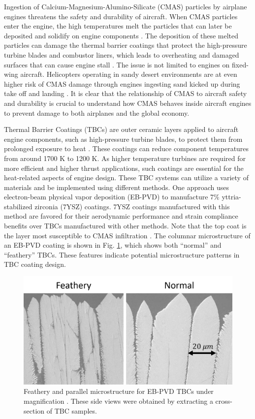\documentclass[%
 aip,
 amsmath,amssymb,
 reprint,%
floatfix]{revtex4-1}
\begin{document}
Ingestion of Calcium-Magnesium-Alumino-Silicate (CMAS) particles by airplane engines threatens the safety and durability of aircraft. 
When CMAS particles enter the engine, the high temperatures melt the particles that can later be deposited and solidify on engine components \cite{Chen2015}. The deposition of these melted particles can damage the thermal barrier coatings that protect the high-pressure turbine blades and combustor liners, which leads to overheating and damaged surfaces that can cause engine stall \cite{Chen2015}. The issue is not limited to engines on fixed-wing aircraft. Helicopters operating in sandy desert environments are at even higher risk of CMAS damage through engines ingesting sand kicked up during take off and landing \cite{Smialek}. 
It is clear that the relationship of CMAS to aircraft safety and durability is crucial to understand how CMAS behaves inside aircraft engines to prevent damage to both airplanes and the global economy.

Thermal Barrier Coatings (TBCs) are outer ceramic layers applied to aircraft engine components, such as high-pressure turbine blades, to protect them from prolonged exposure to heat \cite{Bennett2005}. These coatings can reduce component temperatures \cite{Sirigiri2018} from around 1700 K to 1200 K. As higher temperature turbines are required for more efficient and higher thrust applications, such coatings are essential for the heat-related aspects of engine design. 
These TBC systems can utilize a variety of materials and be implemented using different methods. One approach uses electron-beam physical vapor deposition (EB-PVD) to manufacture 7\% yttria-stabilized zirconia (7YSZ) coatings. 7YSZ coatings manufactured with this method are favored for their aerodynamic performance and strain compliance benefits over TBCs manufactured with other methods. Note that the top coat is the layer most susceptible to CMAS infiltration \cite{Renteria2007}. 
The columnar microstructure of an EB-PVD coating is shown in Fig. \ref{fig:TBC_scans}, which shows both ``normal'' and ``feathery'' TBCs. These features indicate potential microstructure patterns in TBC coating design. 

\begin{figure}
\includegraphics[width=.9\linewidth]{Figures/SEM.png}
\caption{Feathery and parallel microstructure for EB-PVD TBCs under magnification \cite{Naraparaju2017}. These side views were obtained by extracting a cross-section of TBC samples.}
\label{fig:TBC_scans}
\end{figure}
\end{document}
